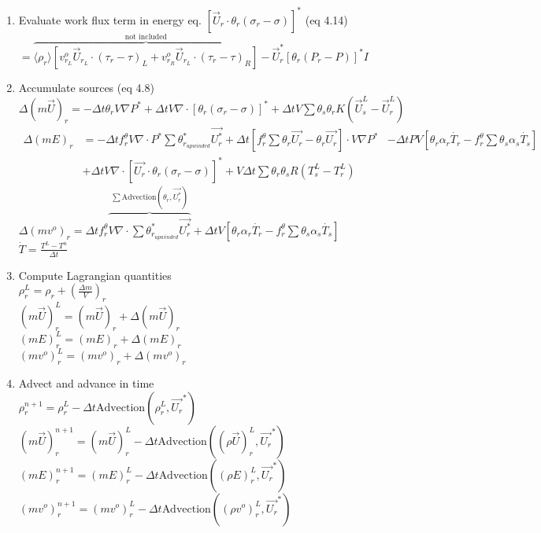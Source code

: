 \documentclass[fleqn]{article}
\newcommand{\delt}          {\ensuremath{\Delta{t}} }
\newcommand{\f}             {\ensuremath{f^{\theta}_r} }
\newcommand{\sv}[1]         {\ensuremath{v^o_{r_{#1}} }}
\begin{document}
\begin{enumerate}
\item Evaluate work flux term in energy eq. $[\vec{U}_r \cdot \theta_r(\sigma_r - \sigma)]^*$ 
      \hspace{ 0.5 in} (eq 4.14)\\
$ = \overbrace{\langle \rho_r\rangle[\sv{L}\vec{U}_{r_L} \cdot {(\tau_r - \tau)_L} 
                        + \sv{R}\vec{U}_{r_L} \cdot {(\tau_r - \tau)_R}] }^{\text{not included}}
                        - \vec{U}^*_r[\theta_r(P_r - P)]^*I$
\item Accumulate sources (eq 4.8)\\  
   $\Delta(m\vec{U})_r = -\delt \theta_r V \nabla P^* 
                         + \delt V\nabla \cdot [\theta_r(\sigma_r - \sigma)]^*
                         + \delt V \sum \theta_s \theta_r K (\vec{U}^L_s - \vec{U}^L_r)$
   \begin{eqnarray*}
   \Delta(mE)_r &= -\delt \f V \nabla \cdot P^* \sum{\theta^*_{r_{upwinded}}\vec{U^*_r}} 
                 + \delt[\f \sum{\theta_r\vec{U_r}} - \theta_r\vec{U_r}] \cdot V \nabla P ^*
                &- \delt P V[\theta_r \alpha_r \dot{T_r} - \f \sum{\theta_s \alpha_s \dot{T_s}}] \\
                &+ \delt V \nabla \cdot [ \vec{U_r} \cdot \theta_r( \sigma_r - \sigma)] ^*
                 + V \delt\sum \theta_r \theta_s R(T^L_s - T^L_r)
   \end{eqnarray*}
  $\Delta(mv^o)_r = \delt \f \overbrace{V \nabla \cdot \sum{\theta^*_{r_{upwinded}}\vec{U^*_r}}}^{\sum\text{Advection}(\theta_r,\vec{U^*_r})}
                + \delt V [\theta_r \alpha_r \dot{T_r} 
                - \f \sum{\theta_s \alpha_s \dot{T_s}}] $\\
  $\dot{T} = \frac{T^L - T^n}{\delt}$
\item Compute Lagrangian quantities\\
    $\rho^L_r = \rho_r + (\frac{\Delta{m}}{V})_r$ \\
    $(m \vec{U})^L_r = (m\vec{U})_r + \Delta(m\vec{U})_r$ \\
    $(mE)^L_r = (mE)_r + \Delta(mE)_r $\\
    $(mv^o)^L_r = (mv^o)_r + \Delta(mv^o)_r $\\
\item Advect and advance in time\\
$   \rho^{n+1}_r         = \rho^L_r     - \delt\text{Advection}(\rho^L_r, \vec{U_r}^*)$\\
$   (m\vec{U})^{n+1}_r   = (m\vec{U})^L_r - \delt\text{Advection}((\rho\vec{U})^L_r, \vec{U_r}^*)$\\
$   (mE)^{n+1}_r         = (mE)^L_r       - \delt\text{Advection}((\rho E)^L_r, \vec{U_r}^*) $ \\
$   (mv^o)^{n+1}_r     = (mv^o)^L_r   - \delt\text{Advection}((\rho v^o)^L_r, \vec{U_r}^*) $

\end{enumerate}
\end{document}

